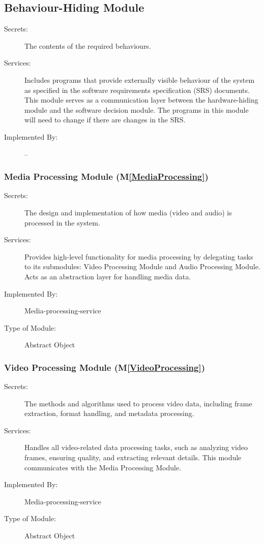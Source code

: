 \documentclass[12pt, titlepage]{article}
\newcommand{\mref}[1]{M\ref{#1}}
\begin{document}
\subsection{Behaviour-Hiding Module}

\begin{description}
\item[Secrets:]The contents of the required behaviours.
\item[Services:]Includes programs that provide externally visible behaviour of
  the system as specified in the software requirements specification (SRS)
  documents. This module serves as a communication layer between the
  hardware-hiding module and the software decision module. The programs in this
  module will need to change if there are changes in the SRS.
\item[Implemented By:] --
\end{description}

\subsubsection{Media Processing Module (\mref{MediaProcessing})}
\begin{description}
\item[Secrets:] The design and implementation of how media (video and audio) is processed in the system.
\item[Services:] Provides high-level functionality for media processing by delegating tasks to its submodules: Video Processing Module and Audio Processing Module. Acts as an abstraction layer for handling media data.
\item[Implemented By:] Media-processing-service
\item[Type of Module:]  Abstract Object
\end{description}

\subsubsection{Video Processing Module (\mref{VideoProcessing})}
\begin{description}
\item[Secrets:] The methods and algorithms used to process video data, including frame extraction, format handling, and metadata processing.
\item[Services:] Handles all video-related data processing tasks, such as analyzing video frames, ensuring quality, and extracting relevant details. This module communicates with the Media Processing Module.
\item[Implemented By:] Media-processing-service
\item[Type of Module:]  Abstract Object
\end{description}
\end{document}
